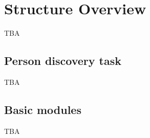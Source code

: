 \section{Structure Overview}

TBA

\subsection{Person discovery task}

TBA

\subsection{Basic modules}

TBA

\endinput

